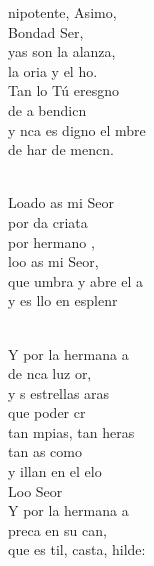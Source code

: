\begin{cancion}%
	nipotente, Asimo,  \\
	Bondad Ser,\\
	yas son la alanza, \\
	la oria y el ho.\\
	Tan lo Tú eresgno  \\
	de a bendicn\\
	y nca es digno el mbre\\
	de har de mencn. \\\jump\\
	\begin{chorus}%
	Loado as mi Seor\\
	por da criata\\
	por  hermano ,\\
	loo as mi Seor,\\
	que umbra y abre el a \\
	y es llo en esplenr\\
	\end{chorus}%
	\jump\\
	Y por la hermana a\\
	de nca luz or,\\
	y s estrellas aras \\
	que  poder cr\\
	tan mpias, tan heras\\
	tan as como \\
	y illan en el elo\\
	Loo Seor\\
	Y por la hermana a \\
	preca en su can,\\
	que es til, casta, hilde: \\

\end{cancion}
